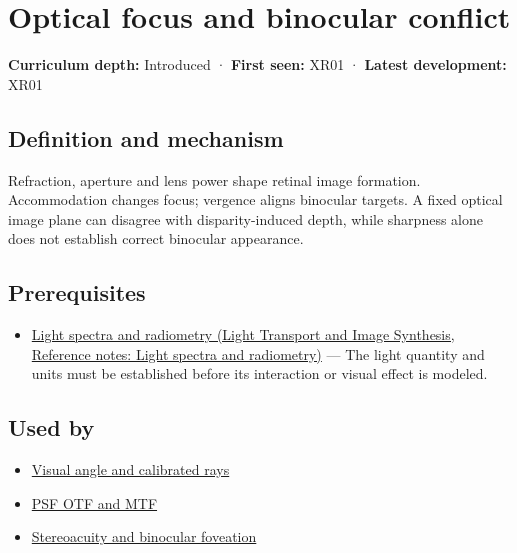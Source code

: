 \hypertarget{appendix-f90cee1be7a4}{}\label{referencestart:appendix-f90cee1be7a4}
\section{Optical focus and binocular conflict}\label{appendix-f90cee1be7a4-optical-focus-and-binocular-conflict}

\textbf{Curriculum depth:} Introduced · \textbf{First seen:} XR01 · \textbf{Latest development:} XR01

\subsection{Definition and mechanism}\label{appendix-f90cee1be7a4-definition-and-mechanism}

Refraction, aperture and lens power shape retinal image formation. Accommodation changes focus; vergence aligns binocular targets. A fixed optical image plane can disagree with disparity-induced depth, while sharpness alone does not establish correct binocular appearance.

\subsection{Prerequisites}\label{appendix-f90cee1be7a4-prerequisites}

\begin{itemize}
\tightlist
\item
  \href{../04-Light-Transport-and-Image-Synthesis/main.pdf\#nameddest=appendix-215c2570199b}{Light spectra and radiometry (Light Transport and Image Synthesis, Reference notes: Light spectra and radiometry)} --- The light quantity and units must be established before its interaction or visual effect is modeled.
\end{itemize}

\subsection{Used by}\label{appendix-f90cee1be7a4-used-by}

\begin{itemize}
\tightlist
\item
  \hyperref[appendix-7d356c396d1a]{Visual angle and calibrated rays}
\item
  \hyperref[appendix-8b76b0efd27f]{PSF OTF and MTF}
\item
  \hyperref[appendix-8dc848f14052]{Stereoacuity and binocular foveation}
\end{itemize}

